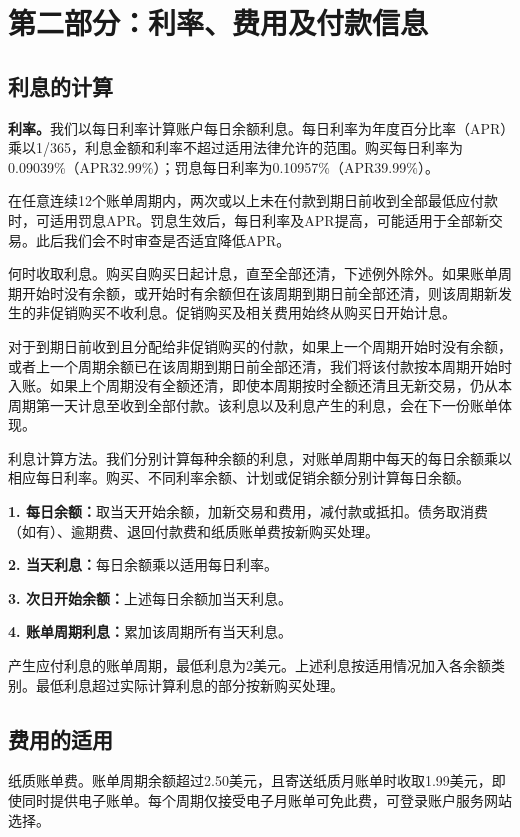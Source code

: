 \documentclass[UTF8,fontset=none,11pt,a4paper]{ctexart}
\begin{document}
\section*{第二部分：利率、费用及付款信息}
\subsection*{利息的计算}
\textbf{利率。}我们以每日利率计算账户每日余额利息。每日利率为年度百分比率（APR）乘以1/365，利息金额和利率不超过适用法律允许的范围。购买每日利率为0.09039\%（APR32.99\%）；罚息每日利率为0.10957\%（APR39.99\%）。


在任意连续12个账单周期内，两次或以上未在付款到期日前收到全部最低应付款时，可适用罚息APR。罚息生效后，每日利率及APR提高，可能适用于全部新交易。此后我们会不时审查是否适宜降低APR。


何时收取利息。购买自购买日起计息，直至全部还清，下述例外除外。如果账单周期开始时没有余额，或开始时有余额但在该周期到期日前全部还清，则该周期新发生的非促销购买不收利息。促销购买及相关费用始终从购买日\allowbreak\mbox{开始计息。}


对于到期日前收到且分配给非促销购买的付款，如果上一个周期开始时没有余额，或者上一个周期余额已在该周期到期日前全部还清，我们将该付款按本周期开始时入账。如果上个周期没有全额还清，即使本周期按时全额还清且无新交易，仍从本周期第一天计息至收到全部付款。该利息以及利息产生的利息，会在下一份\allowbreak\mbox{账单体现。}


利息计算方法。我们分别计算每种余额的利息，对账单周期中每天的每日余额乘以相应每日利率。购买、不同利率余额、计划或促销余额分别计算\allowbreak\mbox{每日余额。}


\textbf{1. 每日余额：}取当天开始余额，加新交易和费用，减付款或抵扣。债务取消费（如有）、逾期费、退回付款费和纸质账单费按新\allowbreak\mbox{购买处理。}


\textbf{2. 当天利息：}每日余额乘以适用\allowbreak\mbox{每日利率。}


\textbf{3. 次日开始余额：}上述每日余额加\allowbreak\mbox{当天利息。}


\textbf{4. 账单周期利息：}累加该周期所有\allowbreak\mbox{当天利息。}


产生应付利息的账单周期，最低利息为2美元。上述利息按适用情况加入各余额类别。最低利息超过实际计算利息的部分按新\allowbreak\mbox{购买处理。}


\subsection*{费用的适用}
纸质账单费。账单周期余额超过2.50美元，且寄送纸质月账单时收取1.99美元，即使同时提供电子账单。每个周期仅接受电子月账单可免此费，可登录账户服务\allowbreak\mbox{网站选择。}
\end{document}
